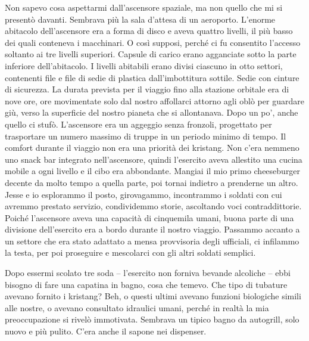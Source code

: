 Non sapevo cosa aspettarmi dall'ascensore spaziale, ma non quello che mi
si presentò davanti. Sembrava più la sala d'attesa di un aeroporto.
L'enorme abitacolo dell'ascensore era a forma di disco e aveva quattro
livelli, il più basso dei quali conteneva i macchinari. O così supposi,
perché ci fu consentito l'accesso soltanto ai tre livelli superiori.
Capsule di carico erano agganciate sotto la parte inferiore
dell'abitacolo. I livelli abitabili erano divisi ciascuno in otto
settori, contenenti file e file di sedie di plastica dall'imbottitura
sottile. Sedie con cinture di sicurezza. La durata prevista per il
viaggio fino alla stazione orbitale era di nove ore, ore movimentate
solo dal nostro affollarci attorno agli oblò per guardare giù, verso la
superficie del nostro pianeta che si allontanava. Dopo un po', anche
quello ci stufò. L'ascensore era un aggeggio senza fronzoli, progettato
per trasportare un numero massimo di truppe in un periodo minimo di
tempo. Il comfort durante il viaggio non era una priorità dei kristang.
Non c'era nemmeno uno snack bar integrato nell'ascensore, quindi
l'esercito aveva allestito una cucina mobile a ogni livello e il cibo
era abbondante. Mangiai il mio primo cheeseburger decente da molto tempo
a quella parte, poi tornai indietro a prenderne un altro. Jesse e io
esplorammo il posto, girovagammo, incontrammo i soldati con cui avremmo
prestato servizio, condividemmo storie, ascoltando voci contraddittorie.
Poiché l'ascensore aveva una capacità di cinquemila umani, buona parte
di una divisione dell'esercito era a bordo durante il nostro viaggio.
Passammo accanto a un settore che era stato adattato a mensa provvisoria
degli ufficiali, ci infilammo la testa, per poi proseguire e mescolarci
con gli altri soldati semplici.

Dopo essermi scolato tre soda -- l'esercito non forniva bevande
alcoliche -- ebbi bisogno di fare una capatina in bagno, cosa che
temevo. Che tipo di tubature avevano fornito i kristang? Beh, o questi
ultimi avevano funzioni biologiche simili alle nostre, o avevano
consultato idraulici umani, perché in realtà la mia preoccupazione si
rivelò immotivata. Sembrava un tipico bagno da autogrill, solo nuovo e
più pulito. C'era anche il sapone nei dispenser.

